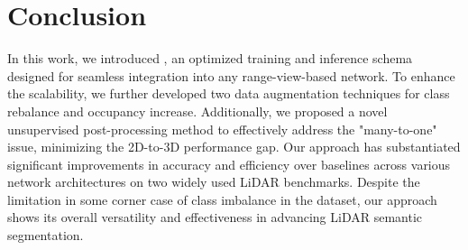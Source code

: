 \section{Conclusion}
In this work, we introduced \coolname{}, an optimized training and inference schema designed for seamless integration into any range-view-based network. To enhance the scalability, we further developed two data augmentation techniques for class rebalance and occupancy increase. Additionally, we proposed a novel unsupervised post-processing method to effectively address the "many-to-one" issue, minimizing the 2D-to-3D performance gap. Our approach has substantiated significant improvements in accuracy and efficiency over baselines across various network architectures on two widely used LiDAR benchmarks. Despite the limitation in some corner case of class imbalance in the dataset, our approach shows its overall versatility and effectiveness in advancing LiDAR semantic segmentation.

